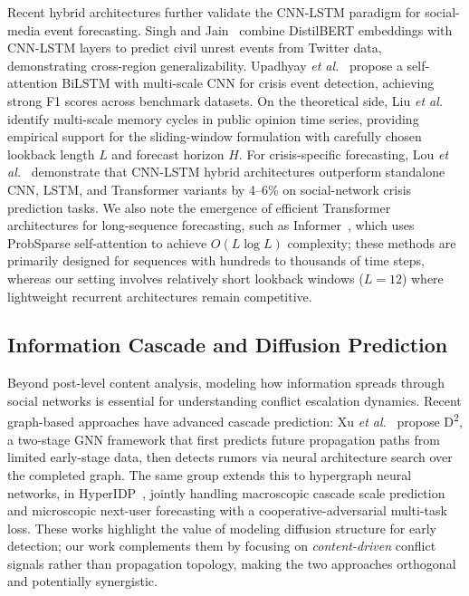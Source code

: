 \documentclass[journal]{IEEEtran}
\begin{document}
Recent hybrid architectures further validate the CNN-LSTM paradigm for social-media event forecasting. Singh and Jain~\cite{singh2025cupcdlstm} combine DistilBERT embeddings with CNN-LSTM layers to predict civil unrest events from Twitter data, demonstrating cross-region generalizability. Upadhyay \emph{et al.}~\cite{upadhyay2024satcobilstm} propose a self-attention BiLSTM with multi-scale CNN for crisis event detection, achieving strong F1 scores across benchmark datasets. On the theoretical side, Liu \emph{et al.}~\cite{liu2025memory} identify multi-scale memory cycles in public opinion time series, providing empirical support for the sliding-window formulation with carefully chosen lookback length $L$ and forecast horizon $H$. For crisis-specific forecasting, Lou \emph{et al.}~\cite{lou2024cnnlstm} demonstrate that CNN-LSTM hybrid architectures outperform standalone CNN, LSTM, and Transformer variants by 4--6\% on social-network crisis prediction tasks. We also note the emergence of efficient Transformer architectures for long-sequence forecasting, such as Informer~\cite{zhou2021informer}, which uses ProbSparse self-attention to achieve $O(L\log L)$ complexity; these methods are primarily designed for sequences with hundreds to thousands of time steps, whereas our setting involves relatively short lookback windows ($L{=}12$) where lightweight recurrent architectures remain competitive.

\subsection{Information Cascade and Diffusion Prediction}

Beyond post-level content analysis, modeling how information spreads through social networks is essential for understanding conflict escalation dynamics. Recent graph-based approaches have advanced cascade prediction: Xu \emph{et al.}~\cite{xu2025d2} propose D\textsuperscript{2}, a two-stage GNN framework that first predicts future propagation paths from limited early-stage data, then detects rumors via neural architecture search over the completed graph. The same group extends this to hypergraph neural networks, in HyperIDP~\cite{xu2025hyperidp}, jointly handling macroscopic cascade scale prediction and microscopic next-user forecasting with a cooperative-adversarial multi-task loss. These works highlight the value of modeling diffusion structure for early detection; our work complements them by focusing on \emph{content-driven} conflict signals rather than propagation topology, making the two approaches orthogonal and potentially synergistic.
\end{document}
